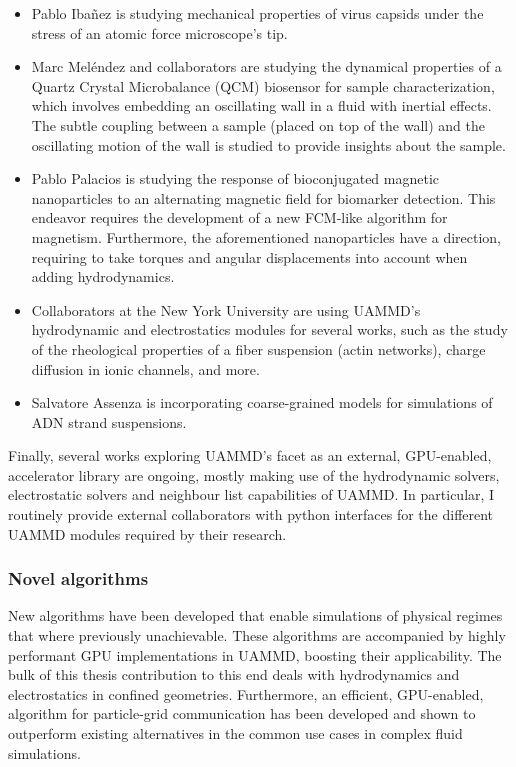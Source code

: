 \documentclass[twoside,openright,titlepage,numbers=noenddot,%
headinclude,footinclude,cleardoublepage=empty,abstract=on,
BCOR=5mm,fontsize=11pt, dvipsnames, paper=b5
]{scrreprt}
\begin{document}
\begin{itemize}
\item Pablo Ibañez is studying mechanical properties of virus capsids under the stress of an atomic force microscope's tip.
\item Marc Meléndez and collaborators are studying the dynamical properties of a Quartz Crystal Microbalance (QCM) biosensor for sample characterization, which involves embedding an oscillating wall in a fluid with inertial effects. The subtle coupling between a sample (placed on top of the wall) and the oscillating motion of the wall is studied to provide insights about the sample.
\item Pablo Palacios is studying the response of bioconjugated magnetic nanoparticles to an alternating magnetic field for biomarker detection. This endeavor requires the development of a new \gls{FCM}-like algorithm for magnetism. Furthermore, the aforementioned nanoparticles have a direction, requiring to take torques and angular displacements into account when adding hydrodynamics.
\item Collaborators at the New York University are using UAMMD's hydrodynamic and electrostatics modules for several works, such as the study of the rheological properties of a fiber suspension (actin networks), charge diffusion in ionic channels, and more. 
\item Salvatore Assenza is incorporating coarse-grained models for simulations of ADN strand suspensions.
\end{itemize}

Finally, several works exploring UAMMD's facet as an external, GPU-enabled, accelerator library are ongoing, mostly making use of the hydrodynamic solvers, electrostatic solvers and neighbour list capabilities of UAMMD. In particular, I routinely provide external collaborators with python interfaces for the different UAMMD modules required by their research.

\subsubsection*{Novel algorithms}
New algorithms have been developed that enable simulations of physical regimes that where previously unachievable. These algorithms are accompanied by highly performant GPU implementations in UAMMD, boosting their applicability. The bulk of this thesis contribution to this end deals with hydrodynamics and electrostatics in confined geometries. Furthermore, an efficient, GPU-enabled, algorithm for particle-grid communication has been developed and shown to outperform existing alternatives in the common use cases in complex fluid simulations.
\end{document}
